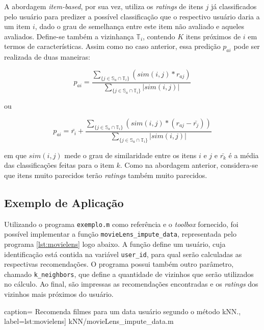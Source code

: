 \vspace{12pt}

A abordagem \textit{item-based}, por sua vez, utiliza os \textit{ratings} de
itens \(j\) já classificados pelo usuário para predizer a possível classificação
que o respectivo usuário daria a um item \(i\), dado o grau de semelhança entre este
item não avaliado e aqueles avaliados. Define-se também a vizinhança
\(\mathbb{T}_i\), contendo \(K\) itens próximos de \(i\) em termos de
características. Assim como no caso anterior, essa predição \(p_{ai}\) pode ser
realizada de duas maneiras:


\begin{equation}
p_{ai} = \frac{\sum_{\{ j\in \mathbb{S}_a \cap \mathbb{T}_i \}} \left(
sim(i,j) * r_{aj} \right)}{\sum_{\{ j\in \mathbb{S}_a \cap \mathbb{T}_i \}}
\left| sim(i,j)\right|}
\end{equation}

ou

\begin{equation}
p_{ai} = \bar{r_i} + \frac{\sum_{\{ j\in \mathbb{S}_a \cap \mathbb{T}_i \}}
\left( sim(i,j) * (r_{aj} - \bar{r_j})\right)}{\sum_{\{ j\in \mathbb{S}_a \cap
\mathbb{T}_i \}} \left| sim(i,j)\right|}
\end{equation}

em que \(sim(i,j)\) mede o grau de similaridade entre os itens \(i\) e \(j\) e
\(\bar{r_k}\) é a média das classificações feitas para o item \(k\). Como na
abordagem anterior, considera-se que itens muito parecidos terão
\textit{ratings} também muito parecidos.

\subsection{Exemplo de Aplicação}
 
Utilizando o programa \texttt{exemplo.m} como referência e o \textit{toolbox}
fornecido, foi possível implementar a função \texttt{movieLens\_impute\_data},
representada pelo programa \ref{lst:movielens} logo abaixo. A função define um
usuário, cuja identificação está contida na variável \texttt{user\_id}, para
qual serão calculadas as respectivas recomendações. O programa possui também
outro parâmetro, chamado \texttt{k\_neighbors}, que define a quantidade de
vizinhos que serão utilizados no cálculo. Ao final, são impressas as
recomendações encontradas e os \textit{ratings} dos vizinhos mais próximos do
usuário.

 caption={
	Recomenda filmes para um data usuário segundo o método kNN.},
	label={lst:movielens}] {kNN/movieLens_impute_data.m}
 
